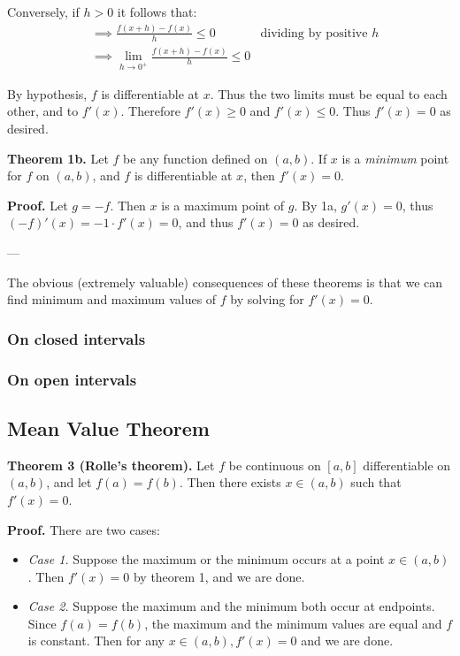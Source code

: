 Conversely, if $h>0$ it follows that:
\begin{align*}
  &\implies \frac{f(x+h)-f(x)}{h}\leq0&\text{dividing by positive $h$}\\
  &\implies \lim_{h\to0^+}\frac{f(x+h)-f(x)}{h}\leq0
\end{align*}

By hypothesis, $f$ is differentiable at $x$. Thus the two limits must
be equal to each other, and to $f'(x)$. Therefore $f'(x)\geq0$ and
$f'(x)\leq0$. Thus $f'(x)=0$ as desired.

\vs

\textbf{Theorem 1b.} Let $f$ be any function defined on $(a,b)$. If
$x$ is a \textit{minimum} point for $f$ on $(a,b)$, and $f$ is
differentiable at $x$, then $f'(x)=0$.

\vs

\textbf{Proof.} Let $g=-f$. Then $x$ is a maximum point of $g$. By 1a,
$g'(x)=0$, thus $(-f)'(x)=-1\cdot f'(x)=0$, and thus $f'(x)=0$ as desired.

\vs---\vs

The obvious (extremely valuable) consequences of these theorems is
that we can find minimum and maximum values of $f$ by solving for
$f'(x)=0$.

\subsubsection*{On closed intervals}

\subsubsection*{On open intervals}

\subsection{Mean Value Theorem}

\textbf{Theorem 3 (Rolle's theorem).} Let $f$ be continuous on $[a,b]$
differentiable on $(a,b)$, and let $f(a)=f(b)$. Then there exists
$x\in(a,b)$ such that $f'(x)=0$.

\vs

\textbf{Proof.} There are two cases:
\begin{itemize}
\item \textit{Case 1.} Suppose the maximum or the minimum occurs at a
  point $x\in(a,b)$. Then $f'(x)=0$ by theorem 1, and we are done.
\item \textit{Case 2.} Suppose the maximum and the minimum both occur
  at endpoints. Since $f(a)=f(b)$, the maximum and the minimum values
  are equal and $f$ is constant. Then for any $x\in(a,b), f'(x)=0$ and
  we are done.
\end{itemize}

